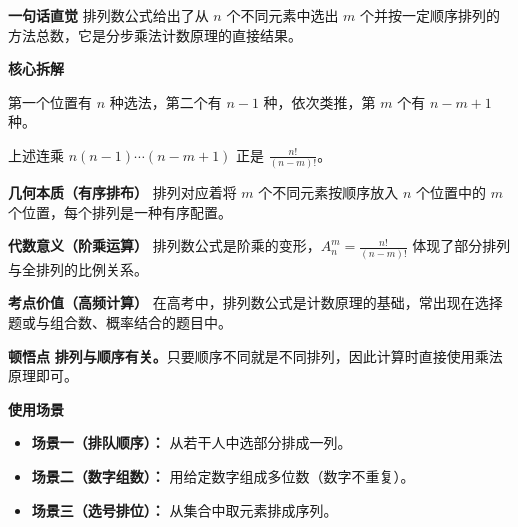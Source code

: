 \begin{explanationbox}
	\textbf{\textcolor{CExplanation}{一句话直觉}}
	排列数公式给出了从 $n$ 个不同元素中选出 $m$ 个并按一定顺序排列的方法总数，它是分步乘法计数原理的直接结果。

	\medskip
	\textbf{\textcolor{CExplanation}{核心拆解}}
	\begin{description}[style=nextline, leftmargin=2.8em, labelsep=0.5em, itemsep=0.45em]
		\item[\textbf{要点一（分步选位）：}]
			第一个位置有 $n$ 种选法，第二个有 $n-1$ 种，依次类推，第 $m$ 个有 $n-m+1$ 种。
		\item[\textbf{要点二（连乘与阶乘）：}]
			上述连乘 $n(n-1)\cdots(n-m+1)$ 正是 $\frac{n!}{(n-m)!}$。
	\end{description}

	\medskip
	\textbf{\textcolor{CExplanation}{几何本质（有序排布）}}
	排列对应着将 $m$ 个不同元素按顺序放入 $n$ 个位置中的 $m$ 个位置，每个排列是一种有序配置。

	\medskip
	\textbf{\textcolor{CExplanation}{代数意义（阶乘运算）}}
	排列数公式是阶乘的变形，$A_n^m = \frac{n!}{(n-m)!}$ 体现了部分排列与全排列的比例关系。

	\medskip
	\textbf{\textcolor{CExplanation}{考点价值（高频计算）}}
	在高考中，排列数公式是计数原理的基础，常出现在选择题或与组合数、概率结合的题目中。

	\medskip
	\textbf{\textcolor{CExplanation}{顿悟点}}
	\textbf{排列与顺序有关。}只要顺序不同就是不同排列，因此计算时直接使用乘法原理即可。

	\medskip
	\textbf{\textcolor{CExplanation}{使用场景}}
	\begin{itemize}[leftmargin=*, itemsep=0.5em, topsep=0.4em]
		\item \textbf{场景一（排队顺序）：} 从若干人中选部分排成一列。
		\item \textbf{场景二（数字组数）：} 用给定数字组成多位数（数字不重复）。
		\item \textbf{场景三（选号排位）：} 从集合中取元素排成序列。
	\end{itemize}

\end{explanationbox}
